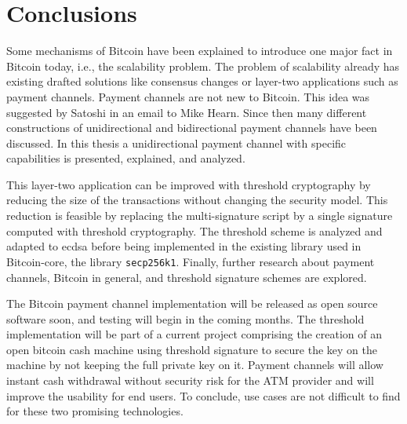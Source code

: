 \chapter{Conclusions}
\label{chap:conclusions}

Some mechanisms of Bitcoin have been explained to introduce one major
fact in Bitcoin today, i.e., the scalability problem. The problem of scalability
already has existing drafted solutions like consensus changes or layer-two
applications such as payment channels. Payment channels are not new to Bitcoin.
This idea was suggested by Satoshi in an email to Mike Hearn. Since then many
different constructions of unidirectional and bidirectional payment channels
have been discussed. In this thesis a unidirectional payment channel with
specific capabilities is presented, explained, and analyzed.

This layer-two application can be improved with threshold cryptography by
reducing the size of the transactions without changing the security model. This
reduction is feasible by replacing the multi-signature script by a single
signature computed with threshold cryptography. The threshold scheme is analyzed
and adapted to \gls{ecdsa} before being implemented in the existing library used
in Bitcoin-core, the library \texttt{secp256k1}. Finally, further research about
payment channels, Bitcoin in general, and threshold signature schemes are
explored.

The Bitcoin payment channel implementation will be released as open source
software soon, and testing will begin in the coming months.  The threshold
implementation will be part of a current project comprising the creation of an
open bitcoin cash machine using threshold signature to secure the key on the
machine by not keeping the full private key on it. Payment channels will allow
instant cash withdrawal without security risk for the ATM provider and will
improve the usability for end users. To conclude, use cases are not difficult to
find for these two promising technologies.
